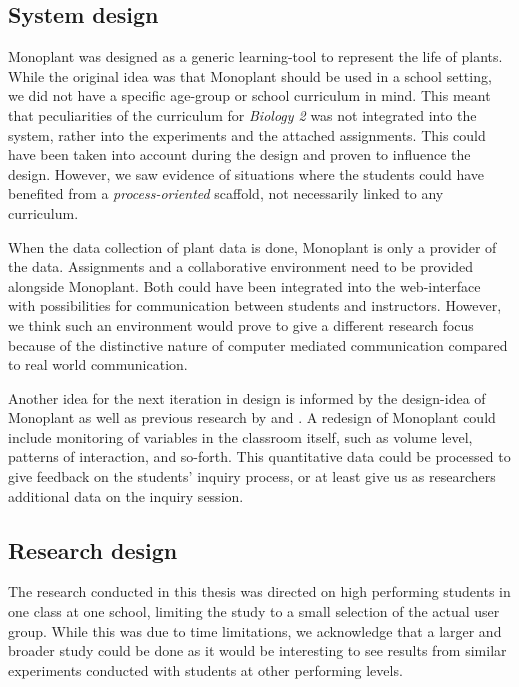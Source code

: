 \subsection{System design}
Monoplant was designed as a generic learning-tool to represent the life of plants. While the original idea was that Monoplant should be used in a school setting, we did not have a specific age-group or school curriculum in mind. This meant that peculiarities of the curriculum for \emph{Biology 2} was not integrated into the system, rather into the experiments and the attached assignments. This could have been taken into account during the design and proven to influence the design. However, we saw evidence of situations where the students could have benefited from a \emph{process-oriented} scaffold, not necessarily linked to any curriculum.

When the data collection of plant data is done, Monoplant is only a provider of the data. Assignments and a collaborative environment need to be provided alongside Monoplant. Both could have been integrated into the web-interface with possibilities for communication between students and instructors. However, we think such an environment would prove to give a different research focus because of the distinctive nature of computer mediated communication compared to real world communication. 

Another idea for the next iteration in design is informed by the design-idea of Monoplant as well as previous research by \citet{fischer1991critics} and \citet{furberg2009socio}. A redesign of Monoplant could include monitoring of variables in the classroom itself, such as volume level, patterns of interaction, and so-forth. This quantitative data could be processed to give feedback on the students' inquiry process, or at least give us as researchers additional data on the inquiry session.

\subsection{Research design}
The research conducted in this thesis was directed on high performing students in one class at one school, limiting the study to a small selection of the actual user group. While this was due to time limitations, we acknowledge that a larger and broader study could be done as it would be interesting to see results from similar experiments conducted with students at other performing levels.

